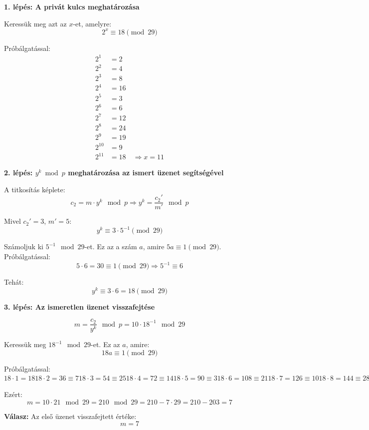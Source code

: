 \begin{solution}

\textbf{1. lépés: A privát kulcs meghatározása}

Keressük meg azt az $x$-et, amelyre: 
\[
2^{x}\equiv18\pmod{29}
\]

Próbálgatással: 
\[
\begin{aligned}2^{1} & =2\\
2^{2} & =4\\
2^{3} & =8\\
2^{4} & =16\\
2^{5} & =3\\
2^{6} & =6\\
2^{7} & =12\\
2^{8} & =24\\
2^{9} & =19\\
2^{10} & =9\\
2^{11} & =18\quad\Rightarrow x=11
\end{aligned}
\]

\textbf{2. lépés: $y^{k}\bmod p$ meghatározása az ismert üzenet segítségével}

A titkosítás képlete: 
\[
c_{2}=m\cdot y^{k}\mod p\Rightarrow y^{k}=\frac{c_{2}'}{m'}\mod p
\]

Mivel $c_{2}'=3$, $m'=5$: 
\[
y^{k}\equiv3\cdot5^{-1}\pmod{29}
\]

Számoljuk ki $5^{-1}\mod 29$-et. Ez az a szám $a$, amire $5a\equiv1\pmod{29}$.
Próbálgatással: 
\[
5\cdot6=30\equiv1\pmod{29}\Rightarrow5^{-1}\equiv6
\]

Tehát: 
\[
y^{k}\equiv3\cdot6=18\pmod{29}
\]

\textbf{3. lépés: Az ismeretlen üzenet visszafejtése}

\[
m=\frac{c_{2}}{y^{k}}\mod p=10\cdot18^{-1}\mod 29
\]

Keressük meg $18^{-1}\mod 29$-et. Ez az $a$, amire: 
\[
18a\equiv1\pmod{29}
\]

Próbálgatással: $18\cdot1=1818\cdot2=36\equiv718\cdot3=54\equiv2518\cdot4=72\equiv1418\cdot5=90\equiv318\cdot6=108\equiv2118\cdot7=126\equiv1018\cdot8=144\equiv2818\cdot9=162\equiv1818\cdot10=180\equiv618\cdot11=198\equiv2418\cdot12=216\equiv1318\cdot13=234\equiv218\cdot14=252\equiv2018\cdot15=270\equiv918\cdot16=288\equiv2718\cdot17=306\equiv1718\cdot18=324\equiv618\cdot19=342\equiv2518\cdot20=360\equiv1218\cdot21=378\equiv1\Rightarrow18^{-1}\equiv21\pmod{29}$

Ezért: 
\[
m=10\cdot21\mod 29=210\mod 29=210-7\cdot29=210-203=7
\]

\textbf{Válasz:} Az első üzenet visszafejtett értéke: 
\[
\boxed{m=7}
\]
\end{solution}
